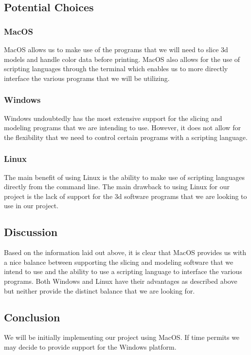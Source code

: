 \documentclass[letterpaper, onecolumn, draftclsnofoot, 10pt, compsoc]{IEEEtran}
\begin{document}
\subsection{Potential Choices}
\subsubsection{MacOS}
	\begin{singlespace}
	MacOS allows us to make use of the programs that we will need to slice 3d models and handle color data before printing. MacOS also allows for the use of scripting languages through the terminal which enables us to more directly interface the various programs that we will be utilizing.
	\end{singlespace}
\subsubsection{Windows}
	\begin{singlespace}
	Windows undoubtedly has the most extensive support for the slicing and modeling programs that we are intending to use. However, it does not allow for the flexibility that we need to control certain programs with a scripting language. 
	\end{singlespace}
\subsubsection{Linux}
	\begin{singlespace}
	The main benefit of using Linux is the ability to make use of scripting languages directly from the command line. The main drawback to using Linux for our project is the lack of support for the 3d software programs that we are looking to use in our project. 
	\end{singlespace}
\subsection{Discussion}
	\begin{singlespace}
    Based on the information laid out above, it is clear that MacOS provides us with a nice balance between supporting the slicing and modeling software that we intend to use and the ability to use a scripting language to interface the various programs. Both Windows and Linux have their advantages as described above but neither provide the distinct balance that we are looking for.
	\end{singlespace}
\subsection{Conclusion}
	\begin{singlespace}
	We will be initially implementing our project using MacOS. If time permits we may decide to provide support for the Windows platform. 
	\end{singlespace}
    
\newpage


\end{document}

